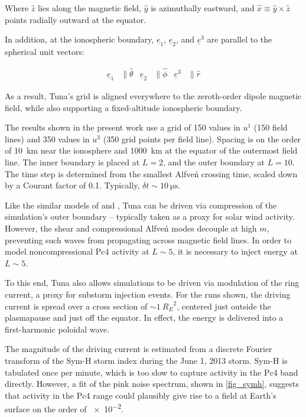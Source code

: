 \documentclass[draft,linenumbers]{agujournal}
\begin{document}
Where $\hat{z}$ lies along the magnetic field, $\hat{y}$ is azimuthally eastward, and $\hat{x} \equiv \hat{y} \times \hat{z}$ points radially outward at the equator.

In addition, at the ionospheric boundary, $\underline{e}_1$, $\underline{e}_2$, and $\underline{e}^3$ are parallel to the spherical unit vectors:
\begin{linenomath*}
\begin{align}
  \underline{e}_1 &\parallel \hat{\theta} &
  \underline{e}_2 &\parallel \hat{\phi} &
  \underline{e}^3 &\parallel \hat{r}
\end{align}
\end{linenomath*}


As a result, Tuna's grid is aligned everywhere to the zeroth-order dipole magnetic field, while also supporting a fixed-altitude ionospheric boundary.

The results shown in the present work use a grid of 150 values in $u^1$ (150 field lines) and 350 values in $u^3$ (350 grid points per field line). Spacing is on the order of \SI{10}{\km} near the ionosphere and \SI{1000}{\km} at the equator of the outermost field line. The inner boundary is placed at $L = 2$, and the outer boundary at $L = 10$. The time step is determined from the smallest Alfve\'n crossing time, scaled down by a Courant factor of \num{0.1}. Typically, $\delta \! t \sim \SI{10}{\us}$.


Like the similar models of \citet{lysak_2013} and \citet{waters_2013}, Tuna can be driven via compression of the simulation's outer boundary -- typically taken as a proxy for solar wind activity. However, the shear and compressional Alfve\'n modes decouple at high $m$, preventing such waves from propagating across magnetic field lines. In order to model noncompressional Pc4 activity at $L\sim5$, it is necessary to inject energy at $L\sim5$.

To this end, Tuna also allows simulations to be driven via modulation of the ring current, a proxy for substorm injection events. For the runs shown, the driving current is spread over a cross section of $\sim\SI{1}{R_E}^2$, centered just outside the plasmapause and just off the equator. In effect, the energy is delivered into a first-harmonic poloidal wave.

The magnitude of the driving current is estimated from a discrete Fourier transform of the Sym-H storm index during the June 1, 2013 storm. Sym-H is tabulated once per minute, which is too slow to capture activity in the Pc4 band directly. However, a fit of the pink noise spectrum, shown in \cref{fig_symh}, suggests that activity in the Pc4 range could plausibly give rise to a field at Earth's surface on the order of \SI{e-2}{\nT}.
\end{document}
